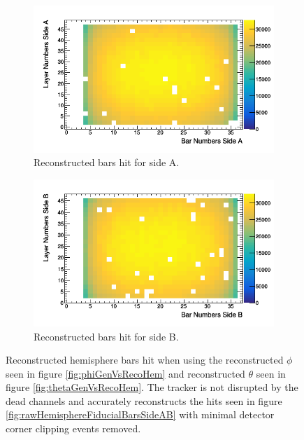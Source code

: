 \begin{figure}[htbp]
\centering
\begin{subfigure}{.5\textwidth}
  \centering
  \includegraphics[width=\linewidth]{Chapter5/Figs/Raster/hemisphereFiducialBarsSideA.png}
  \captionsetup{width=.9\linewidth}
  \caption{Reconstructed bars hit for side A.}
  \label{subFig:hemisphereFiducialBarsSideA}
\end{subfigure}%
\begin{subfigure}{.5\textwidth}
  \centering
\includegraphics[width=\linewidth]{Chapter5/Figs/Raster/hemisphereFiducialBarsSideB.png}
  \captionsetup{width=.9\linewidth}
  \caption{Reconstructed bars hit for side B.}
  \label{subFig:hemisphereFiducialBarsSideB}
\end{subfigure}
\caption{Reconstructed hemisphere bars hit when using the reconstructed $\phi$ seen in figure \ref{fig:phiGenVsRecoHem} and reconstructed $\theta$ seen in figure \ref{fig:thetaGenVsRecoHem}. The tracker is not disrupted by the dead channels and accurately reconstructs the hits seen in figure \ref{fig:rawHemisphereFiducialBarsSideAB} with minimal detector corner clipping events removed.}
\label{fig:HemisphereFiducialBarsSideAB}
\end{figure}

